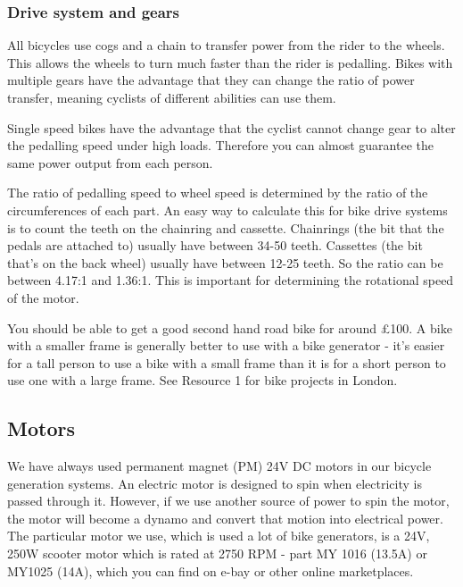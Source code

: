 \documentclass{article}
\theoremstyle{definition}
\theoremstyle{definition}
\theoremstyle{remark}
\begin{document}
    \subsubsection*{Drive system and gears} %
    \label{ssub:drive_system_and_gears}

      All bicycles use cogs and a chain to transfer power from the rider to the wheels. This allows the wheels to turn much faster than the rider is pedalling. Bikes with multiple gears have the advantage that they can change the ratio of power transfer, meaning cyclists of different abilities can use them.

      Single speed bikes have the advantage that the cyclist cannot change gear to alter the pedalling speed under high loads. Therefore you can almost guarantee the same power output from each person.

      The ratio of pedalling speed to wheel speed is determined by the ratio of the circumferences of each part. An easy way to calculate this for bike drive systems is to count the teeth on the chainring and cassette. Chainrings (the bit that the pedals are attached to) usually have between 34-50 teeth. Cassettes (the bit that’s on the back wheel) usually have between 12-25 teeth. So the ratio can be between 4.17:1 and 1.36:1.
      This is important for determining the rotational speed of the motor. 

      You should be able to get a good second hand road bike for around £100. A bike with a smaller frame is generally better to use with a bike generator - it’s easier for a tall person to use a bike with a small frame than it is for a short person to use one with a large frame. See Resource 1 for bike projects in London.
    
  

  \subsection{Motors} %
  \label{sub:motors}

    We have always used permanent magnet (PM) 24V DC motors in our bicycle generation systems. An electric motor is designed to spin when electricity is passed through it. However, if we use another source of power to spin the motor, the motor will become a dynamo and convert that motion into electrical power. The particular motor we use, which is used a lot of bike generators, is a 24V, 250W scooter motor which is rated at 2750 RPM - part MY 1016 (13.5A) or MY1025 (14A), which you can find on e-bay or other online marketplaces.
\end{document}
